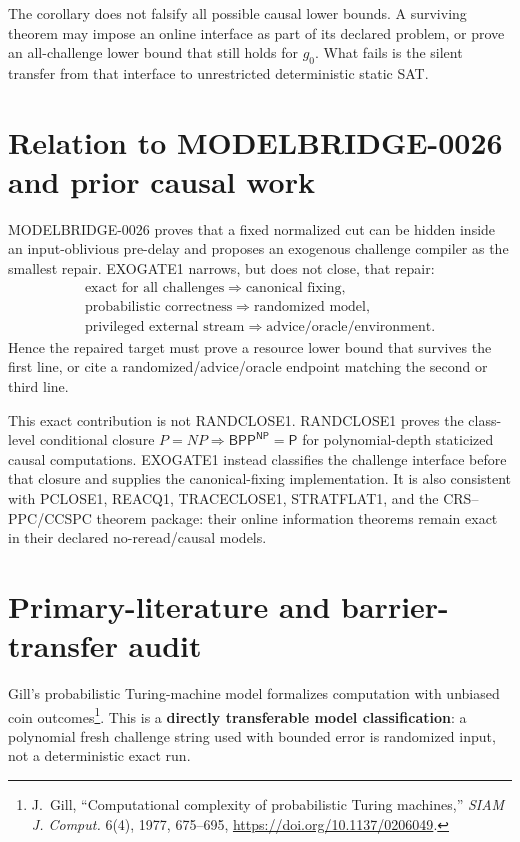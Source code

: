 \documentclass[11pt]{article}
\begin{document}
The corollary does not falsify all possible causal lower bounds.  A surviving
theorem may impose an online interface as part of its declared problem, or
prove an all-challenge lower bound that still holds for $g_0$.  What fails is
the silent transfer from that interface to unrestricted deterministic static
SAT.

\section{Relation to MODELBRIDGE-0026 and prior causal work}

MODELBRIDGE-0026 proves that a fixed normalized cut can be hidden inside an
input-oblivious pre-delay and proposes an exogenous challenge compiler as the
smallest repair.  EXOGATE1 narrows, but does not close, that repair:
\[
\begin{array}{c}
\text{exact for all challenges}\Rightarrow\text{canonical fixing},\\
\text{probabilistic correctness}\Rightarrow\text{randomized model},\\
\text{privileged external stream}\Rightarrow\text{advice/oracle/environment}.
\end{array}                                                       \tag{5}
\]
Hence the repaired target must prove a resource lower bound that survives
the first line, or cite a randomized/advice/oracle endpoint matching the
second or third line.

This exact contribution is not RANDCLOSE1.  RANDCLOSE1 proves the class-level
conditional closure
$P=NP\Rightarrow\mathsf{BPP}^{\mathsf{NP}}=\mathsf P$ for polynomial-depth
staticized causal computations.  EXOGATE1 instead classifies the challenge
interface before that closure and supplies the canonical-fixing
implementation.  It is also consistent with PCLOSE1, REACQ1, TRACECLOSE1,
STRATFLAT1, and the CRS--PPC/CCSPC theorem package: their online information
theorems remain exact in their declared no-reread/causal models.

\section{Primary-literature and barrier-transfer audit}

Gill's probabilistic Turing-machine model formalizes computation with unbiased
coin outcomes\footnote{J.~Gill, ``Computational complexity of probabilistic
Turing machines,'' \emph{SIAM J. Comput.} 6(4), 1977, 675--695,
\url{https://doi.org/10.1137/0206049}.}.  This is a
\textbf{directly transferable model classification}: a polynomial fresh
challenge string used with bounded error is randomized input, not a
deterministic exact run.
\end{document}
